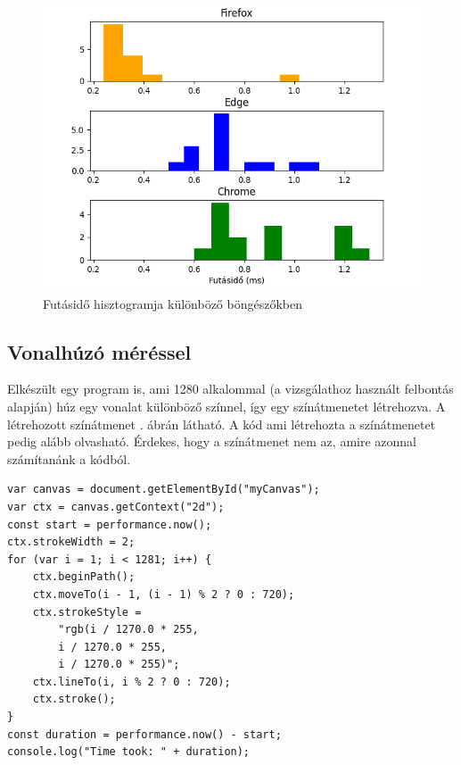 \begin{figure}[h!]
    \centering
    \includegraphics[width=14truecm]{images/histogram_browsers.png}
    \caption{Futásidő hisztogramja különböző böngészőkben}
    \label{fig:hist-browsers}
\end{figure}

\pagebreak

\subsection{Vonalhúzó méréssel}

Elkészült egy program is, ami 1280 alkalommal (a vizsgálathoz használt felbontás alapján) húz egy vonalat különböző színnel, így egy színátmenetet létrehozva. A létrehozott színátmenet . ábrán látható. A kód ami létrehozta a színátmenetet pedig alább olvasható. Érdekes, hogy a színátmenet nem az, amire azonnal számítanánk a kódból.

\begin{verbatim}
var canvas = document.getElementById("myCanvas");
var ctx = canvas.getContext("2d");
const start = performance.now();
ctx.strokeWidth = 2;
for (var i = 1; i < 1281; i++) {
    ctx.beginPath();
    ctx.moveTo(i - 1, (i - 1) % 2 ? 0 : 720);
    ctx.strokeStyle =
        "rgb(i / 1270.0 * 255,
        i / 1270.0 * 255,
        i / 1270.0 * 255)";
    ctx.lineTo(i, i % 2 ? 0 : 720);
    ctx.stroke();
}
const duration = performance.now() - start;
console.log("Time took: " + duration);
\end{verbatim}

